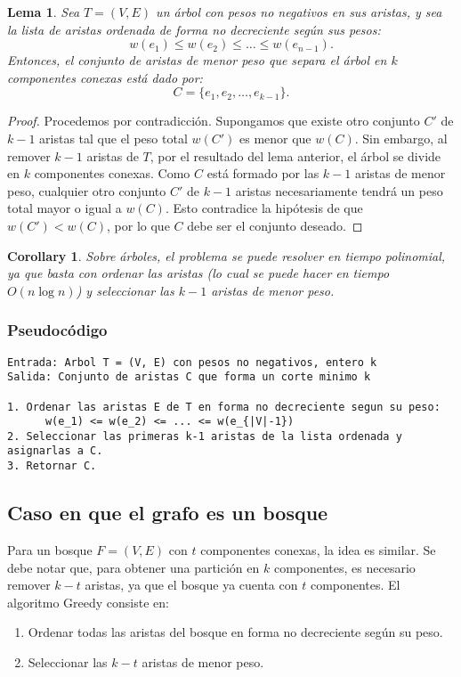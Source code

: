 \documentclass[a4paper, 12pt]{article}
\newtheorem{lemma}{Lema}[section]
\newtheorem{corollary}{Corollary}
\begin{document}
\begin{lemma}
Sea \( T = (V, E) \) un árbol con pesos no negativos en sus aristas, y sea la lista de aristas ordenada de forma no decreciente según sus pesos:
\[
w(e_1) \le w(e_2) \le \dots \le w(e_{n-1}).
\]
Entonces, el conjunto de aristas de menor peso que separa el árbol en \( k \) componentes conexas está dado por:
\[
C = \{ e_1, e_2, \dots, e_{k-1} \}.
\]
\end{lemma}

\begin{proof}
Procedemos por contradicción. Supongamos que existe otro conjunto \( C' \) de \( k-1 \) aristas tal que el peso total \( w(C') \) es menor que \( w(C) \).  
Sin embargo, al remover \( k-1 \) aristas de \( T \), por el resultado del lema anterior, el árbol se divide en \( k \) componentes conexas.  
Como \( C \) está formado por las \( k-1 \) aristas de menor peso, cualquier otro conjunto \( C' \) de \( k-1 \) aristas necesariamente tendrá un peso total mayor o igual a \( w(C) \).  
Esto contradice la hipótesis de que \( w(C') < w(C) \), por lo que \( C \) debe ser el conjunto deseado.
\end{proof}

\begin{corollary}
Sobre árboles, el problema se puede resolver en tiempo polinomial, ya que basta con ordenar las aristas (lo cual se puede hacer en tiempo \( O(n \log n) \)) y seleccionar las \( k-1 \) aristas de menor peso.
\end{corollary}

\subsubsection{Pseudocódigo}

\begin{lstlisting}
Entrada: Arbol T = (V, E) con pesos no negativos, entero k
Salida: Conjunto de aristas C que forma un corte minimo k

1. Ordenar las aristas E de T en forma no decreciente segun su peso: 
      w(e_1) <= w(e_2) <= ... <= w(e_{|V|-1})
2. Seleccionar las primeras k-1 aristas de la lista ordenada y asignarlas a C.
3. Retornar C.
\end{lstlisting}


\subsection{Caso en que el grafo es un bosque}
Para un bosque \( F = (V,E) \) con \( t \) componentes conexas, la idea es similar. Se debe notar que, para obtener una partición en \( k \) componentes, es necesario remover \( k-t \) aristas, ya que el bosque ya cuenta con \( t \) componentes. El algoritmo Greedy consiste en:
\begin{enumerate}
    \item Ordenar todas las aristas del bosque en forma no decreciente según su peso.
    \item Seleccionar las \( k-t \) aristas de menor peso.
\end{enumerate}
\end{document}
